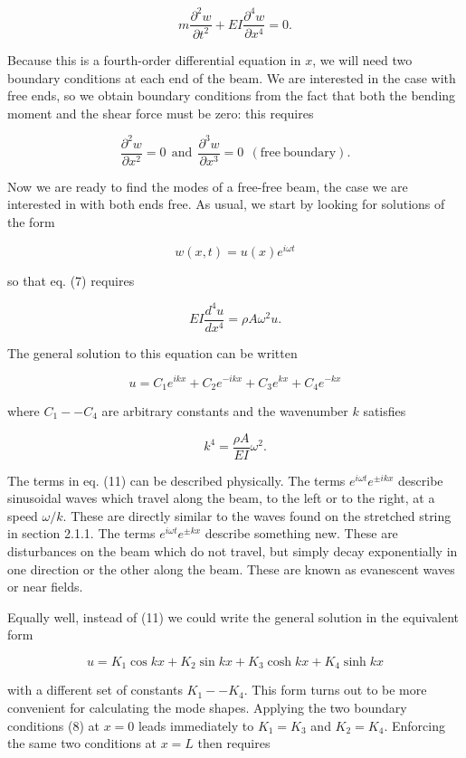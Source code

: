   $$m \dfrac{\partial^2 w}{\partial t^2}+EI \dfrac{\partial^4 w}{\partial 
  x^4}=0 . \tag{7}$$ 

  Because this is a fourth-order differential equation in $x$, we will need two 
  boundary conditions at each end of the beam. We are interested in the case 
  with free ends, so we obtain boundary conditions from the fact that both the 
  bending moment and the shear force must be zero: this requires 

  $$\dfrac{\partial^2 w}{\partial x^2}=0 \mathrm{~~and~~} \dfrac{\partial^3 
  w}{\partial x^3}=0~~\mathrm{(free~boundary).} \tag{8}$$ 

  Now we are ready to find the modes of a free-free beam, the case we are 
  interested in with both ends free. As usual, we start by looking for 
  solutions of the form 

  $$w(x,t) = u(x) e^{i \omega t} \tag{9}$$ 

  so that eq. (7) requires 

  $$EI\dfrac{d^4 u}{d x^4}= \rho A \omega^2 u. \tag{10}$$ 

  The general solution to this equation can be written 

  $$u=C_1 e^{ikx} + C_2 e^{-ikx} + C_3 e^{kx} + C_4 e^{-kx} \tag{11}$$ 

  where $C_1 -- C_4$ are arbitrary constants and the wavenumber $k$ satisfies 

  $$k^4 = \dfrac{\rho A}{EI}\omega^2 . \tag{12}$$ 

  The terms in eq. (11) can be described physically. The terms $e^{i \omega t} 
  e^{\pm i k x}$ describe sinusoidal waves which travel along the beam, to the 
  left or to the right, at a speed $\omega/k$. These are directly similar to 
  the waves found on the stretched string in section 2.1.1. The terms $e^{i 
  \omega t} e^{\pm k x}$ describe something new. These are disturbances on the 
  beam which do not travel, but simply decay exponentially in one direction or 
  the other along the beam. These are known as evanescent waves or near fields. 

  Equally well, instead of (11) we could write the general solution in the 
  equivalent form 

  $$u=K_1 \cos kx + K_2 \sin kx + K_3 \cosh kx + K_4 \sinh kx \tag{13}$$ 

  with a different set of constants $K_1 -- K_4$. This form turns out to be 
  more convenient for calculating the mode shapes. Applying the two boundary 
  conditions (8) at $x=0$ leads immediately to $K_1=K_3$ and $K_2=K_4$. 
  Enforcing the same two conditions at $x=L$ then requires 


